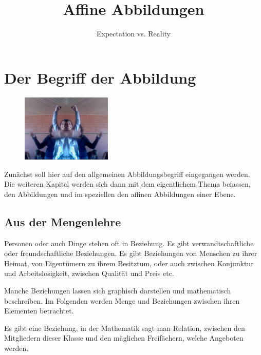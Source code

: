 \documentclass[%
11pt,%
twoside,%
titlepage,%
german,%
headsepline%
]{scrartcl}
\title{Affine Abbildungen}
\subtitle{Expectation vs. Reality}
\author{}
\date{}
\begin{document}
\maketitle
\tableofcontents
\cleardoublepage

\section{Der Begriff der Abbildung}

\begin{figure}
\vspace{-15pt}
  \begin{center}
    \includegraphics[width=0.382\textwidth]{miriam}
  \end{center}
\vspace{-22pt}
\end{figure}
Zunächst soll hier auf den allgemeinen Abbildungsbegriff eingegangen werden. Die weiteren Kapitel werden sich dann mit dem eigentlichem Thema befassen, den Abbildungen und im speziellen den affinen Abbildungen einer Ebene.

\subsection{Aus der Mengenlehre}
Personen oder auch Dinge stehen oft in Beziehung. Es gibt verwandtschaftliche oder freundschaftliche Beziehungen. Es gibt Beziehungen von Menschen zu ihrer Heimat, von Eigentümern zu ihrem Besitztum, oder auch zwischen Konjunktur und Arbeitslosigkeit, zwischen Qualität und Preis etc.

Manche Beziehungen lassen sich graphisch darstellen und mathematisch beschreiben. Im Folgenden werden Menge und Beziehungen zwischen ihren Elementen betrachtet.

\begin{bsp}
Es gibt eine Beziehung, in der Mathematik sagt man Relation, zwischen den Mitgliedern dieser Klasse und den mäglichen Freifächern, welche Angeboten werden.
\end{bsp}
\end{document}
